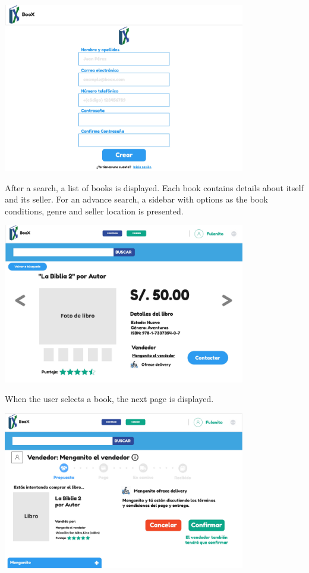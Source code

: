     \subsubsection*{}
    \begin{center}
    \includegraphics[width=300pt]{img/mockups/Huascar Retrieval Team - Registro.jpg}
\end{center}


After a search, a list of books is displayed. Each book contains details about itself  and its seller. For an advance search, a sidebar with options as the book conditions, genre and seller location is presented.\\

\begin{center}
    \includegraphics[width=300pt]{img/mockups/Huascar Retrieval Team - Detalles de libro.jpg}
\end{center}

When the user selects a book, the next page is displayed.\\
\begin{center}
    \includegraphics[width=300pt]{img/mockups/Huascar Retrieval Team - Contactar vendedor - Propuesta.jpg}
\end{center}

